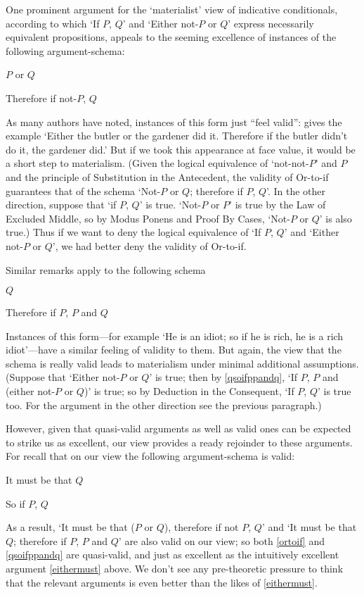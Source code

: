 \documentclass[If.tex]{subfiles}
\begin{document}
One prominent argument for the ‘materialist’ view of indicative conditionals, according to which ‘If $P$, $Q$’ and ‘Either not-$P$ or $Q$’ express necessarily equivalent propositions, appeals to the seeming excellence of instances of the following argument-schema:
\begin{prop}
	\sitem[Or-to-if] \label{ortoif}
	$P$ or $Q$
	
	Therefore if not-$P$, $Q$
\end{prop}
As many authors have noted, instances of this form just “feel valid”: \citet{StalnakerIC} gives the example ‘Either the butler or the gardener did it.  Therefore if the butler didn't do it, the gardener did.’  But if we took this appearance at face value, it would be a short step to materialism.  (Given the logical equivalence of ‘not-not-$P$’ and $P$ and the principle of Substitution in the Antecedent, the validity of Or-to-if guarantees that of the schema ‘Not-$P$ or $Q$; therefore if $P$, $Q$’.  In the other direction, suppose that ‘if $P$, $Q$’ is true.   ‘Not-$P$ or $P$’ is true by the Law of Excluded Middle, so by Modus Ponens and Proof By Cases, ‘Not-$P$ or $Q$’ is also true.)  Thus if we want to deny the logical equivalence of ‘If $P$, $Q$’ and ‘Either not-$P$ or $Q$’, we had better deny the validity of Or-to-if.  

Similar remarks apply to the following schema
\begin{prop}
	 \label{qsoifppandq}
	$Q$
	
	Therefore if $P$, $P$ and $Q$
\end{prop}
Instances of this form---for example ‘He is an idiot; so if he is rich, he is a rich idiot’---have a similar feeling of validity to them.  But again, the view that the schema is really valid leads to materialism under minimal additional assumptions.  (Suppose that ‘Either not-$P$ or $Q$’ is true; then by \ref{qsoifppandq}, ‘If $P$, $P$ and (either not-$P$ or $Q$)’ is true; so by Deduction in the Consequent, ‘If $P$, $Q$’ is true too.  For the argument in the other direction see the previous paragraph.)  

However, given that quasi-valid arguments as well as valid ones can be expected to strike us as excellent, our view provides a ready rejoinder to these arguments. For recall that on our view the following argument-schema is valid:
\begin{prop}
	\sitem[Must-if] \label{mustif}
	It must be that $Q$
	
	So if $P$, $Q$
\end{prop}
As a result, ‘It must be that ($P$ or $Q$), therefore if not $P$, $Q$’ and ‘It must be that $Q$; therefore if $P$, $P$ and $Q$’ are also valid on our view; so both \ref{ortoif} and \ref{qsoifppandq} are quasi-valid, and just as excellent as the intuitively excellent argument \ref{eithermust} above. We don't see any pre-theoretic pressure to think that the relevant arguments is even better than the likes of \ref{eithermust}.
\end{document}
